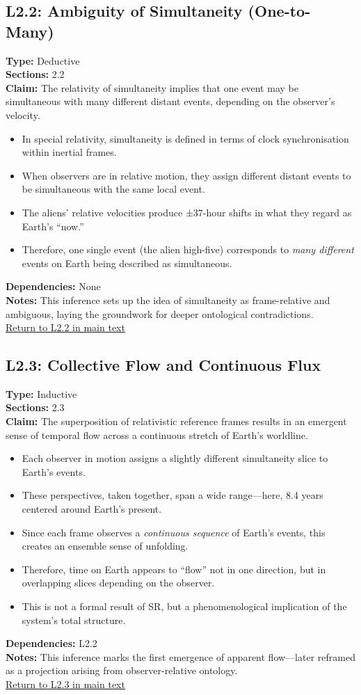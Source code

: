 \documentclass[12pt]{book}
\newcommand{\returnlink}[1]{\hyperref[logic:#1]{Return to #1 in main text}\xspace}
\begin{document}
\subsection*{L2.2: Ambiguity of Simultaneity (One-to-Many)}\label{appendix:L2.2}
\textbf{Type:} Deductive \\
\textbf{Sections:} 2.2 \\
\textbf{Claim:} The relativity of simultaneity implies that one event may be simultaneous with many different distant events, depending on the observer's velocity.
\begin{itemize}
  \item In special relativity, simultaneity is defined in terms of clock synchronisation within inertial frames.
  \item When observers are in relative motion, they assign different distant events to be simultaneous with the same local event.
  \item The aliens' relative velocities produce ±37-hour shifts in what they regard as Earth's ``now.''
  \item Therefore, one single event (the alien high-five) corresponds to \textit{many different} events on Earth being described as simultaneous.
\end{itemize}
\textbf{Dependencies:} None \\
\textbf{Notes:} This inference sets up the idea of simultaneity as frame-relative and ambiguous, laying the groundwork for deeper ontological contradictions.\\
\returnlink{L2.2}

\subsection*{L2.3: Collective Flow and Continuous Flux}\label{appendix:L2.3}
\textbf{Type:} Inductive \\
\textbf{Sections:} 2.3 \\
\textbf{Claim:} The superposition of relativistic reference frames results in an emergent sense of temporal flow across a continuous stretch of Earth's worldline.
\begin{itemize}
  \item Each observer in motion assigns a slightly different simultaneity slice to Earth's events.
  \item These perspectives, taken together, span a wide range---here, 8.4 years centered around Earth's present.
  \item Since each frame observes a \textit{continuous sequence} of Earth's events, this creates an ensemble sense of unfolding.
  \item Therefore, time on Earth appears to ``flow'' not in one direction, but in overlapping slices depending on the observer.
  \item This is not a formal result of SR, but a phenomenological implication of the system's total structure.
\end{itemize}
\textbf{Dependencies:} L2.2 \\
\textbf{Notes:} This inference marks the first emergence of apparent flow---later reframed as a projection arising from observer-relative ontology.\\
\returnlink{L2.3}
\end{document}
